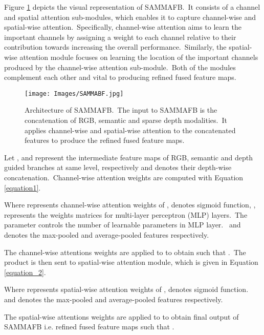 \documentclass{ieeeaccess}
\begin{document}
 Figure \ref{SAMMAFB_Architecture} depicts the visual representation of SAMMAFB.~It consists of a channel and spatial attention sub-modules, which enables it to capture channel-wise and spatial-wise attention.~Specifically, channel-wise attention aims to learn the important channels by assigning a weight to each channel relative to their contribution towards increasing the overall performance.~Similarly, the spatial-wise attention module focuses on learning the location of the important channels produced by the channel-wise attention sub-module.~Both of the modules complement each other and vital to producing refined fused feature maps.
\begin{figure}
\begin{center}
    \texttt{[image: Images/SAMMABF.jpg]} 
\end{center}
\caption{Architecture of SAMMAFB.~The input to SAMMAFB is the concatenation of RGB, semantic and sparse depth modalities.~It applies channel-wise and spatial-wise attention to the concatenated features to produce the refined fused feature maps. }


\label{SAMMAFB_Architecture}
\end{figure}

Let ,  and  represent the intermediate feature maps of RGB, semantic and depth guided branches at same level, respectively and  denotes their depth-wise concatenation.~Channel-wise attention weights are computed with Equation \ref{equation1}. 


Where  represents channel-wise attention weights of ,  denotes sigmoid function, ,  represents the weights matrices for multi-layer perceptron (MLP) layers.~The parameter  controls the number of learnable parameters in MLP layer.~ and   denotes the max-pooled and average-pooled features respectively. 


The channel-wise attentions weights are applied to  to obtain  such that .~The product  is then sent to spatial-wise attention module, which is given in Equation \ref{equation_2}.

Where  represents spatial-wise attention weights of ,  denotes sigmoid function.~ and   denotes the max-pooled and average-pooled features respectively. 

The spatial-wise attentions weights are applied to  to obtain final output of SAMMAFB i.e. refined fused feature maps  such that .
\end{document}
